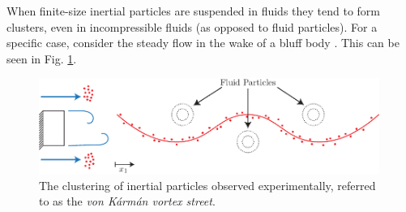 \begin{ex}
	When finite-size inertial particles are suspended in fluids they tend to form clusters, even in incompressible fluids (as opposed to fluid particles). For a specific case, consider the steady flow in the wake of a bluff body \cite{Burns1999}. This can be seen in Fig. \ref{fig:vortex_street}.
\begin{figure}[h!]
	\centering
	\includegraphics[width=0.99\textwidth]{figures/ch9/20vortex_street.pdf}
	\caption{The clustering of inertial particles observed experimentally, referred to as the \emph{von Kármán vortex street}.}
	\label{fig:vortex_street}
\end{figure}


\end{ex}
